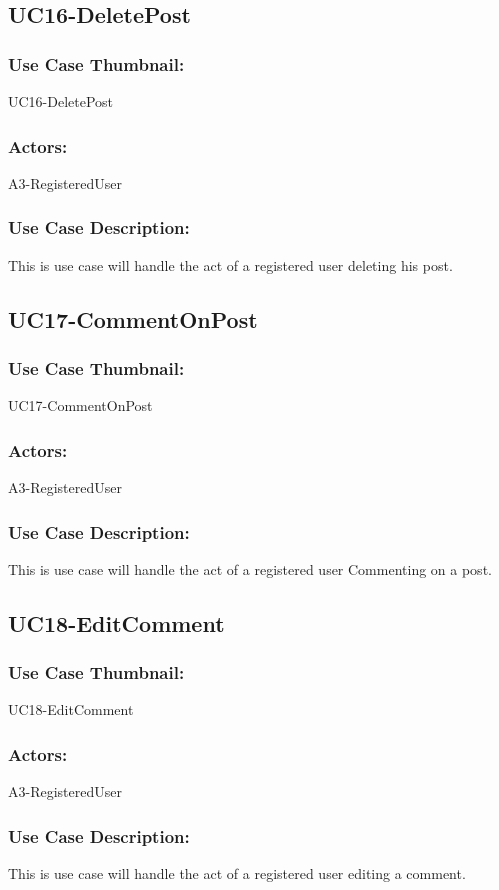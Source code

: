 \documentclass[11pt, openany]{report}
\begin{document}
\subsection{UC16-DeletePost}
\label{sUC16}
\subsubsection*{Use Case Thumbnail:}
UC16-DeletePost
\subsubsection*{Actors:}
A3-RegisteredUser
\subsubsection*{Use Case Description:}
This is use case will handle the act of a registered user deleting his post.

\subsection{UC17-CommentOnPost}
\label{sUC17}
\subsubsection*{Use Case Thumbnail:}
UC17-CommentOnPost
\subsubsection*{Actors:}
A3-RegisteredUser
\subsubsection*{Use Case Description:}
This is use case will handle the act of a registered user Commenting on a post.


\subsection{UC18-EditComment}
\label{sUC18}
\subsubsection*{Use Case Thumbnail:}
UC18-EditComment
\subsubsection*{Actors:}
A3-RegisteredUser
\subsubsection*{Use Case Description:}
This is use case will handle the act of a registered user editing a comment.
\end{document}
